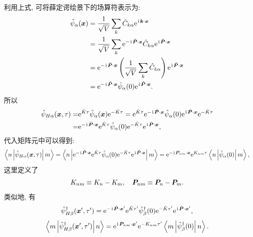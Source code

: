 利用上式, 可将薛定谔绘景下的场算符表示为:
\begin{align}
\hat{\psi}_\alpha(\vct{x}) & =\frac{1}{\sqrt{V}} \sum_{k } \hat{C}_{k \alpha} \e^{\ii \vct{k} \cdot \vct{x}}\nonumber\\
&=\frac{1}{\sqrt{V}} \sum_{k} \e^{-\ii \hat{\vct{P}} \cdot \vct{x}} \hat{C}_{k \alpha} \e^{\ii \hat{\vct{P}} \cdot \vct{x}}\nonumber\\
&=\e^{-\ii \hat{\vct{P}} \cdot \vct{x}}\left(\frac{1}{\sqrt{V}} \sum_{k} \hat{C}_{k \alpha}\right) \e^{\ii \hat{\vct{P}} \cdot \vct{x}} \nonumber\\
& =\e^{-\ii \hat{\vct{P}} \cdot \vct{x}} \hat{\psi}_\alpha(0) \e^{\ii \hat{\vct{P}} \cdot \vct{x}}.
\end{align}
所以
\begin{align}
\hat{\psi}_{H \alpha}(\vct{x}, \tau)=&\e^{\hat{K} \tau} \hat{\psi}_\alpha(\vct{x}) \e^{-\hat{K} \tau}=\e^{\hat{K} \tau} \e^{-\ii \hat{\vct{P}} \cdot \vct{x}} \hat{\psi}_\alpha(0) \e^{\ii \hat{\vct{P}} \cdot \vct{x}} \e^{-\hat{K} \tau}\nonumber\\
=& \e^{-\ii \hat{\vct{P}} \cdot \vct{x}}\e^{\hat{K} \tau} \hat{\psi}_\alpha(0)\e^{-\hat{K} \tau} \e^{\ii \hat{\vct{P}} \cdot \vct{x}} ,
\end{align}
代入矩阵元中可以得到:
\begin{equation}
\left\langle n\left| \hat{\psi}_{H \alpha}(\vct{x}, \tau)\right| m\right\rangle=\left\langle n\left|\e^{-\ii \hat{\vct{P}} \cdot \vct{x}}\e^{\hat{K} \tau} \hat{\psi}_\alpha(0)\e^{-\hat{K} \tau} \e^{\ii \hat{\vct{P}} \cdot \vct{x}}\right| m\right\rangle=\e^{-\ii \vct{P}_{nm} \cdot \vct{x}}\e^{{K}_{nm} \tau}\left\langle n\left|\hat{\psi}_\alpha(0)\right| m\right\rangle,
\end{equation}
这里定义了
\begin{equation}
K_{n m}\equiv K_n-K_m, \quad \vct{P}_{n m}\equiv \vct{P}_n-\vct{P}_m .
\end{equation}
类似地, 有
\begin{equation}
\hat{\psi}^{\dagger}_{H \beta}(\vct{x}^{\prime}, \tau^{\prime})= \e^{-\ii \hat{\vct{P}} \cdot \vct{x}^{\prime}}\e^{\hat{K} \tau^{\prime}} \hat{\psi}^{\dagger}_\beta(0)\e^{-\hat{K} \tau^{\prime}} \e^{\ii \hat{\vct{P}} \cdot \vct{x}^{\prime}} ,
\end{equation}
\begin{equation}
\left\langle m\left| \hat{\psi}^{\dagger}_{H \beta}(\vct{x}^{\prime}, \tau^{\prime})\right| n\right\rangle=\e^{\ii \vct{P}_{nm} \cdot \vct{x}^{\prime}}\e^{-{K}_{nm} \tau^{\prime}}\left\langle m\left|\hat{\psi}^{\dagger}_\beta(0)\right| n\right\rangle.
\end{equation}
